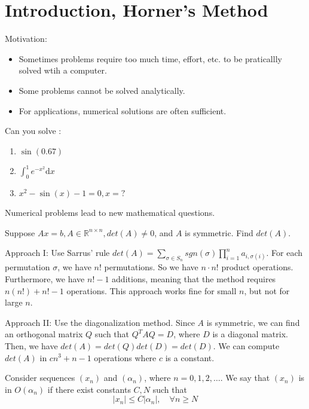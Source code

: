 \documentclass[main.tex]{subfiles}
\begin{document}
\pagestyle{plain}

\chapter{Introduction, Horner's Method}
\label{chap:chapter1}
\par Motivation: 
\begin{itemize}
    \item Sometimes problems require too much time, effort, etc. to be  praticallly solved wtih a computer. 
    \item Some problems cannot be solved analytically. 
    \item For applications, numerical solutions are often sufficient.  
\end{itemize}
\begin{example}
    Can you solve :
    \begin{enumerate}
        \item $\sin(0.67)$
        \item $\displaystyle \int_{0}^{1} e^{-x^2} \mathrm{d} x $
        \item $x^2 - \sin(x) - 1 = 0, x = ?$
    \end{enumerate}
\end{example}
\par Numerical problems lead to new mathematical questions. 
\begin{example}
    Suppose $Ax = b, A\in \mathbb{R}^{n \times n}, det(A)\neq 0$, and $A$ is symmetric. Find $det(A)$. 
    \par Approach I: Use Sarrus' rule $det(A) = \sum_{\sigma \in S_n} sgn(\sigma) \prod_{i=1}^{n} a_{i, \sigma(i)}$. For each permutation $\sigma$, we have $n!$ permutations. So we have $n \cdot n!$ product operations. Furthermore, we have $n! - 1$ additions, meaning that the method requires $n(n!) + n! - 1$ operations. This approach works fine for small $n$, but not for large $n$. 
    \par Approach II: Use the diagonalization method. Since $A$ is symmetric, we can find an orthogonal matrix $Q$ such that $Q^T A Q = D$, where $D$ is a diagonal matrix. Then, we have $det(A) = det(Q) det(D) = det(D)$. We can compute $det(A)$ in $cn^3 + n - 1$ operations where $c$ is a constant.
\end{example}

\begin{definition}
    Consider sequences $(x_n)$ and $(\alpha_n)$, where $n = 0, 1, 2, \ldots$. We say that $(x_n)$ is in $O(\alpha_n)$ if there exist constants $C, N$ such that
    \[
        |x_n| \leq C |\alpha_n|, \quad \forall n \geq N
    \]
\end{definition}
\end{document}
